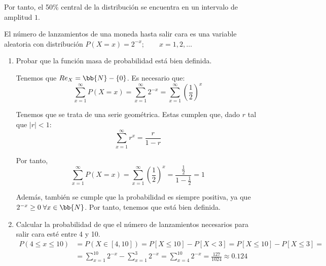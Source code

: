 \begin{ejercicio}
\begin{enumerate}
        Por tanto, el 50\% central de la distribución se encuentra en un intervalo de amplitud $1$.
        
    \end{enumerate}
\end{ejercicio}

\begin{ejercicio}
    El número de lanzamientos de una moneda hasta salir cara es una variable aleatoria con distribución $P(X = x) = 2^{-x};\qquad x = 1, 2, \dots$

    \begin{enumerate}
        \item Probar que la función masa de probabilidad está bien definida.

        Tenemos que $Re_X = \bb{N}-\{0\}$. Es necesario que:
        \begin{equation*}
            \sum_{x=1}^\infty P(X = x) = \sum_{x=1}^\infty 2^{-x}
            = \sum_{x=1}^\infty \left(\frac{1}{2}\right)^x
        \end{equation*}

        Tenemos que se trata de una serie geométrica. Estas cumplen que, dado $r$ tal que $ |r|<1$:
        \begin{equation*}
            \sum_{x=1}^\infty r^x = \frac{r}{1-r}
        \end{equation*}

        Por tanto,
        \begin{equation*}
            \sum_{x=1}^\infty P(X = x)
            = \sum_{x=1}^\infty \left(\frac{1}{2}\right)^x
            = \frac{\frac{1}{2}}{1-\frac{1}{2}} = 1
        \end{equation*}

        Además, también se cumple que la probabilidad es siempre positiva, ya que $2^{-x}\geq 0 \;\forall x\in \bb{N}$. Por tanto, tenemos que está bien definida.

        \item Calcular la probabilidad de que el número de lanzamientos necesarios para salir cara esté entre 4 y 10.
        \begin{equation*}\begin{split}
            P(4\leq x \leq 10) &= P(X\in [4,10]) = P[X\leq 10] - P[X<3] = P[X\leq 10] - P[X\leq 3] =\\&= \sum_{x=1}^{10} 2^{-x} - \sum_{x=1}^3 2^{-x} = \sum_{x=4}^{10} 2^{-x}
            = \frac{127}{1024}\approx 0.124
        \end{split}\end{equation*}


\end{enumerate}
\end{ejercicio}
